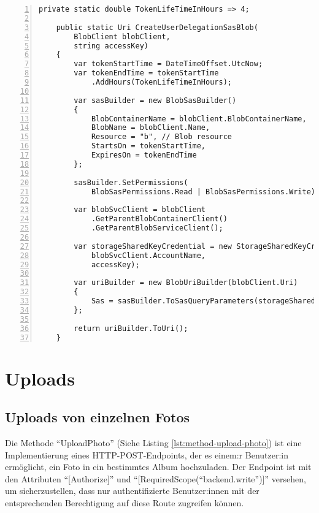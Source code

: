 \begin{lstlisting}[numbers=left,caption={SasTokenGeneratorService},label={lst:sas-token-generator-service}]
    private static double TokenLifeTimeInHours => 4;

    public static Uri CreateUserDelegationSasBlob(
        BlobClient blobClient,
        string accessKey)
    {
        var tokenStartTime = DateTimeOffset.UtcNow;
        var tokenEndTime = tokenStartTime
            .AddHours(TokenLifeTimeInHours);
        
        var sasBuilder = new BlobSasBuilder()
        {
            BlobContainerName = blobClient.BlobContainerName,
            BlobName = blobClient.Name,
            Resource = "b", // Blob resource
            StartsOn = tokenStartTime,
            ExpiresOn = tokenEndTime
        };

        sasBuilder.SetPermissions(
            BlobSasPermissions.Read | BlobSasPermissions.Write);

        var blobSvcClient = blobClient
            .GetParentBlobContainerClient()
            .GetParentBlobServiceClient();
        
        var storageSharedKeyCredential = new StorageSharedKeyCredential(
            blobSvcClient.AccountName,
            accessKey);

        var uriBuilder = new BlobUriBuilder(blobClient.Uri)
        {
            Sas = sasBuilder.ToSasQueryParameters(storageSharedKeyCredential)
        };

        return uriBuilder.ToUri();
    }
\end{lstlisting}

\section{Uploads}

\subsection{Uploads von einzelnen Fotos}

Die Methode ``UploadPhoto'' (Siehe Listing \ref{lst:method-upload-photo}) ist eine Implementierung 
eines HTTP-POST-Endpoints, der es einem:r Benutzer:in ermöglicht, ein Foto in ein bestimmtes 
Album hochzuladen. Der Endpoint ist mit den Attributen ``[Authorize]'' und 
``[RequiredScope(``backend.write'')]'' versehen, um sicherzustellen, dass nur authentifizierte 
Benutzer:innen mit der entsprechenden Berechtigung auf diese Route zugreifen können.

